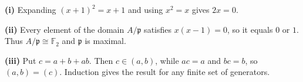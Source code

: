 \textbf{(i)} Expanding $(x+1)^2=x+1$ and using $x^2=x$ gives $2x=0$.

\textbf{(ii)} Every element of the domain $A/\mathfrak p$ satisfies $x(x-1)=0$, so it equals $0$ or $1$. Thus $A/\mathfrak p\cong\mathbb F_2$ and $\mathfrak p$ is maximal.

\textbf{(iii)} Put $c=a+b+ab$. Then $c\in(a,b)$, while $ac=a$ and $bc=b$, so $(a,b)=(c)$. Induction gives the result for any finite set of generators.
